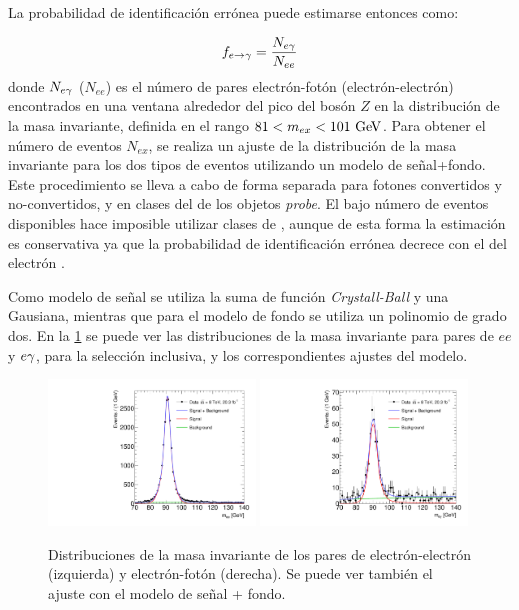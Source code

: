 La probabilidad de identificación errónea {\feg} puede estimarse entonces como:

\begin{equation}\label{eq:efakerate}
  f_{e\rightarrow\gamma} = \frac{N_{e\gamma}}{N_{ee}}
\end{equation}
%
donde $N_{e\gamma}$ ($N_{ee}$) es el número de pares electrón-fotón
(electrón-electrón) encontrados en una ventana alrededor del pico del bosón $Z$ en la distribución de
la masa invariante, definida en el rango $81 < m_{ex} < 101 \gev$. Para obtener
el número de eventos $N_{ex}$, se realiza un ajuste de la distribución de la
masa invariante para los dos tipos de eventos utilizando un modelo de
señal+fondo. Este procedimiento se lleva a cabo de forma separada para fotones
convertidos y no-convertidos, y en clases del {\abseta} de los objetos
\emph{probe}. El bajo número de eventos disponibles hace imposible utilizar
clases de {\pt}, aunque de esta forma la estimación es conservativa ya que la
probabilidad de identificación errónea decrece con el {\pt} del electrón
\cite{Kuhl:1604846}.

Como modelo de señal se utiliza la suma de función \emph{Crystall-Ball} y una
Gausiana, mientras que para el modelo de fondo se utiliza un polinomio de grado
dos. En la \cref{fig:invmass_pairs} se puede ver las distribuciones de la masa
invariante para pares de $ee$ y $e\gamma$, para la selección inclusiva, y los
correspondientes ajustes del modelo.

\begin{figure}[!htbp]
  \centering

  \includegraphics[width=0.49\textwidth]{figures/Fit_mee_efakes_Data_all}
  \includegraphics[width=0.49\textwidth]{figures/Fit_meg_efakes_Data_all}
  \caption{Distribuciones de la masa invariante de los pares de
    electrón-electrón (izquierda) y electrón-fotón (derecha). Se puede ver también el ajuste
    con el modelo de señal + fondo.}
  \label{fig:invmass_pairs}

\end{figure}


